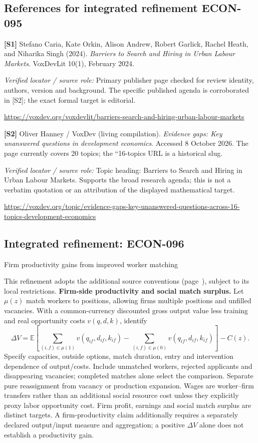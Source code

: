 \documentclass[11pt,a4paper]{article}
\begin{document}
\subsection*{References for integrated refinement ECON-095}
{\footnotesize\raggedright
\par\noindent\textbf{[S1]} Stefano Caria, Kate Orkin, Alison Andrew, Robert Garlick, Rachel Heath, and Niharika Singh (2024). \emph{Barriers to Search and Hiring in Urban Labour Markets}. VoxDevLit 10(1), February 2024.\par \textit{Verified locator / source role:} Primary publisher page checked for review identity, authors, version and background. The specific published agenda is corroborated in [S2]; the exact formal target is editorial.\par \url{https://voxdev.org/voxdevlit/barriers-search-and-hiring-urban-labour-markets}\par\smallskip
\par\noindent\textbf{[S2]} Oliver Hanney / VoxDev (living compilation). \emph{Evidence gaps: Key unanswered questions in development economics}. Accessed 8 October 2026. The page currently covers 20 topics; the ``16-topics URL is a historical slug.\par \textit{Verified locator / source role:} Topic heading: Barriers to Search and Hiring in Urban Labour Markets. Supports the broad research agenda; this is not a verbatim quotation or an attribution of the displayed mathematical target.\par \url{https://voxdev.org/topic/evidence-gaps-key-unanswered-questions-across-16-topics-development-economics}\par\smallskip
}

\subsection*{Integrated refinement: ECON-096}
{\sffamily\small\color{muted}Firm productivity gains from improved worker matching\par}
This refinement adopts the additional source conventions
(page~\pageref{audited:conventions}), subject to its local restrictions.
\textbf{Firm-side productivity and social match surplus.}
Let $\mu(z)$ match workers to positions, allowing firms multiple positions and
unfilled vacancies. With a common-currency discounted gross output value less
training and real opportunity costs $v(q,d,k)$, identify
\[
\Delta V=\mathbb E\left[\sum_{(i,f)\in\mu(1)}v(q_{if},d_{if},k_{if})
       -\sum_{(i,f)\in\mu(0)}v(q_{if},d_{if},k_{if})\right]-C(z).
\]
Specify capacities, outside options, match duration, entry and intervention
dependence of output/costs. Include unmatched workers, rejected applicants and
disappearing vacancies; completed matches alone select the comparison.
Separate pure reassignment from vacancy or production expansion. Wages are
worker--firm transfers rather than an additional social resource cost unless
they explicitly proxy labor opportunity cost. Firm profit, earnings and social
match surplus are distinct targets. A firm-productivity claim additionally requires a separately declared output/input measure and aggregation; a positive \(\Delta V\) alone does not establish a productivity gain.
\end{document}
